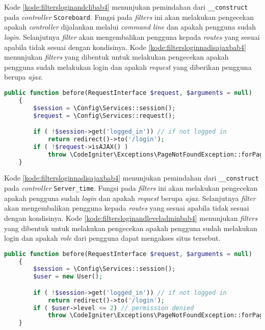 Kode \ref{kode:filtersloginandclibab4} menunjukan pemindahan dari \texttt{\_\_construct} pada \textit{controller}  \texttt{Scoreboard}. Fungsi pada \textit{filters} ini akan melakukan pengecekan apakah \textit{controller} dijalankan melalui \textit{command line} dan apakah pengguna sudah \textit{login}. Selanjutnya \textit{filter} akan mengembalikan pengguna kepada \textit{routes} yang sesuai apabila tidak sesuai dengan kondisinya. Kode \ref{kode:filtersloginnadisajaxbab4} menunjukan \textit{filters} yang dibentuk untuk melakukan pengecekan apakah pengguna sudah melakukan login dan apakah \textit{request} yang diberikan pengguna berupa \textit{ajax}.

\begin{lstlisting}[language=PHP, caption=Pemindahan kode pada \textit{Filters} \texttt{CheckLoginandisAjax.php}, label=kode:filtersloginnadisajaxbab4]
	public function before(RequestInterface $request, $arguments = null)
    {   
        $session = \Config\Services::session();
        $request = \Config\Services::request();

		if ( !$session->get('logged_in')) // if not logged in
			return redirect()->to('/login');
        if ( !$request->isAJAX() )
			throw \CodeIgniter\Exceptions\PageNotFoundException::forPageNotFound();
    }
\end{lstlisting}

Kode \ref{kode:filtersloginnadisajaxbab4} menunjukan pemindahan dari \texttt{\_\_construct} pada \textit{controller}  \texttt{Server\_time}. Fungsi pada \textit{filters} ini akan melakukan pengecekan apakah pengguna sudah \textit{login} dan apakah \textit{request} berupa \textit{ajax}. Selanjutnya \textit{filter} akan mengembalikan pengguna kepada \textit{routes} yang sesuai apabila tidak sesuai dengan kondisinya. Kode \ref{kode:filtersloginandleveladminbab4} menunjukan \textit{filters} yang dibentuk untuk melakukan pengecekan apakah pengguna sudah melakukan login dan apakah \textit{role} dari pengguna dapat mengakses situs tersebut.

\begin{lstlisting}[language=PHP, caption=Pemindahan kode pada \textit{Filters} \texttt{CheckLoginandLevelAdmin.php}, label=kode:filtersloginandleveladminbab4]
	public function before(RequestInterface $request, $arguments = null)
    {   
        $session = \Config\Services::session();
        $user = new User();

		if ( !$session->get('logged_in')) // if not logged in
			return redirect()->to('/login');
        if ( $user->level <= 2) // permission denied
			throw \CodeIgniter\Exceptions\PageNotFoundException::forPageNotFound();	
    }
\end{lstlisting}

